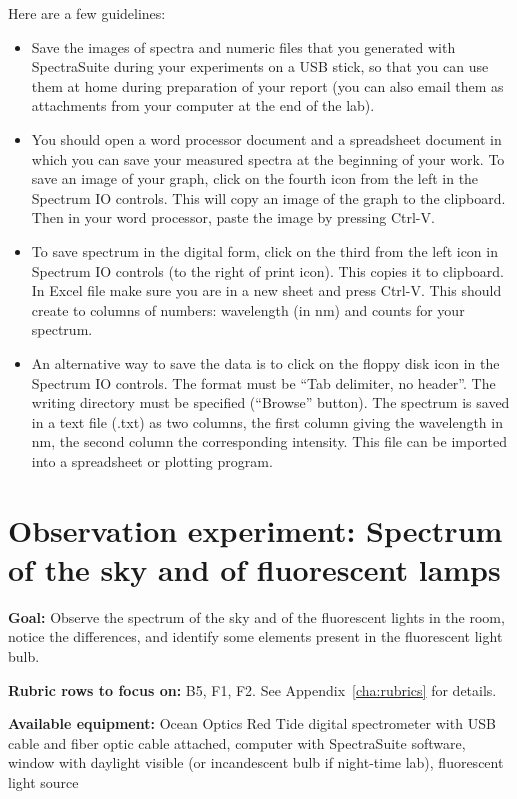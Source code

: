 Here are a few guidelines:
\begin{itemize}
	\item Save the images of spectra and numeric files that you generated with SpectraSuite
	during your experiments on a USB stick, so that you can use them at home during
	preparation of your report (you can also email them as attachments from your
	computer at the end of the lab).
	
	\item You should open a word processor document and a spreadsheet document in which you can save your measured
	spectra at the beginning of your work. To save an image of your graph, click on
	the fourth icon from the left in the Spectrum IO controls. %
	This will copy
	an image of the graph to the clipboard. Then in your word processor, paste the image by pressing
	Ctrl-V.
	
	\item To save spectrum in the digital form, click on the third from the left icon in
	Spectrum IO controls (to the right of print icon). This copies it to clipboard. In
	Excel file make sure you are in a new sheet and press Ctrl-V. This should create
	to columns of numbers: wavelength (in nm) and counts for your spectrum.
	
	\item An alternative way to save the data is to click on the floppy disk icon in the
	Spectrum IO controls. The format must be ``Tab delimiter, no header''. The
	writing directory must be specified (``Browse'' button). The spectrum is saved in a
	text file (.txt) as two columns, the first column giving the wavelength in nm, the
	second column the corresponding intensity. This file can be imported into a spreadsheet or plotting program.
\end{itemize}

\section{Observation experiment: Spectrum of the sky and of fluorescent lamps}

\textbf{Goal:} Observe the spectrum of the sky and of the fluorescent lights in the room, notice the differences, and identify some elements present in the fluorescent light bulb.

\textbf{Rubric rows to focus on:} B5, F1, F2.  See Appendix~\ref{cha:rubrics} for details.

\textbf{Available equipment:} Ocean Optics Red Tide digital spectrometer with USB cable and fiber optic cable attached, computer with SpectraSuite software, window with daylight visible (or incandescent bulb if night-time lab), fluorescent light source

